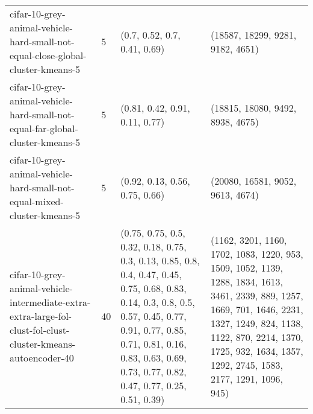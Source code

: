 \begin{longtable}{llll}
                              cifar-10-grey-animal-vehicle-hard-small-not-equal-close-global-cluster-kmeans-5 &              5 &                                                                                                                                                                                                                                                                              (0.7, 0.52, 0.7, 0.41, 0.69) &                                                                                                                                                                                                                                                                          (18587, 18299, 9281, 9182, 4651) \\
                                cifar-10-grey-animal-vehicle-hard-small-not-equal-far-global-cluster-kmeans-5 &              5 &                                                                                                                                                                                                                                                                            (0.81, 0.42, 0.91, 0.11, 0.77) &                                                                                                                                                                                                                                                                          (18815, 18080, 9492, 8938, 4675) \\
                                     cifar-10-grey-animal-vehicle-hard-small-not-equal-mixed-cluster-kmeans-5 &              5 &                                                                                                                                                                                                                                                                            (0.92, 0.13, 0.56, 0.75, 0.66) &                                                                                                                                                                                                                                                                          (20080, 16581, 9052, 9613, 4674) \\
cifar-10-grey-animal-vehicle-intermediate-extra-extra-large-fol-clust-fol-clust-cluster-kmeans-autoencoder-40 &             40 &                                                                 (0.75, 0.75, 0.5, 0.32, 0.18, 0.75, 0.3, 0.13, 0.85, 0.8, 0.4, 0.47, 0.45, 0.75, 0.68, 0.83, 0.14, 0.3, 0.8, 0.5, 0.57, 0.45, 0.77, 0.91, 0.77, 0.85, 0.71, 0.81, 0.16, 0.83, 0.63, 0.69, 0.73, 0.77, 0.82, 0.47, 0.77, 0.25, 0.51, 0.39) &                                                                 (1162, 3201, 1160, 1702, 1083, 1220, 953, 1509, 1052, 1139, 1288, 1834, 1613, 3461, 2339, 889, 1257, 1669, 701, 1646, 2231, 1327, 1249, 824, 1138, 1122, 870, 2214, 1370, 1725, 932, 1634, 1357, 1292, 2745, 1583, 2177, 1291, 1096, 945) \\

\end{longtable}
